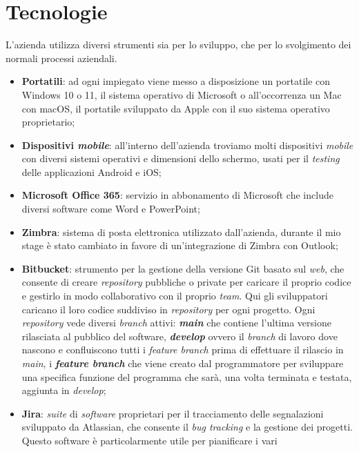 \section{Tecnologie}\label{chap:Tecnologie}
L'azienda utilizza diversi strumenti sia per lo sviluppo, che per lo svolgimento dei normali processi aziendali.
\begin{itemize}
    \item \textbf{Portatili}: ad ogni impiegato viene messo a disposizione un portatile con Windows 10 o 11, il sistema 
          operativo di Microsoft o all'occorrenza un Mac con macOS, il portatile sviluppato da Apple con il suo sistema operativo proprietario;
    \item \textbf{Dispositivi \textit{mobile}}: all'interno dell'azienda troviamo molti dispositivi \textit{mobile} con diversi sistemi operativi e dimensioni 
          dello schermo, usati per il \textit{testing} delle applicazioni Android e iOS;
    \item \textbf{Microsoft Office 365}: servizio in abbonamento di Microsoft che include diversi software come Word e PowerPoint;
    \item \textbf{Zimbra}: sistema di posta elettronica utilizzato dall'azienda, durante il mio stage è stato cambiato in favore di un'integrazione di Zimbra 
          con Outlook;
    \item \textbf{Bitbucket}: strumento per la gestione della versione Git basato sul \textit{web}, che consente di creare 
          \textit{repository} pubbliche o private per caricare il proprio codice e gestirlo in modo collaborativo con il proprio 
          \textit{team}. Qui gli sviluppatori caricano il loro codice suddiviso in \textit{repository} per ogni progetto. Ogni \textit{repository} vede diversi 
          \textit{branch} attivi: \textbf{\textit{main}} che contiene l'ultima versione rilasciata al pubblico del software, \textbf{\textit{develop}} ovvero il 
          \textit{branch} di lavoro dove nascono e confluiscono tutti i \textit{feature branch} prima di effettuare il rilascio in \textit{main}, i 
          \textbf{\textit{feature branch}} che viene creato dal programmatore per sviluppare una specifica funzione del programma che sarà, una volta terminata e
          testata, aggiunta in \textit{develop};
    \item \textbf{Jira}: \textit{suite} di \textit{software} proprietari per il tracciamento delle segnalazioni sviluppato
           da Atlassian, che consente il \textit{bug tracking} e la gestione dei progetti. Questo software è particolarmente utile per pianificare i vari 

\end{itemize}
